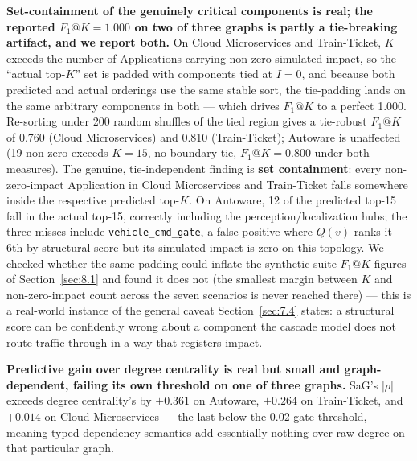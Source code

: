\textbf{Set-containment of the genuinely critical components is real; the reported \(F_1@K=1.000\) on
two of three graphs is partly a tie-breaking artifact, and we report both.} On Cloud Microservices
and Train-Ticket, \(K\) exceeds the number of Applications carrying non-zero simulated impact, so the
``actual top-\(K\)'' set is padded with components tied at \(I=0\), and because both predicted and
actual orderings use the same stable sort, the tie-padding lands on the same arbitrary components in
both --- which drives \(F_1@K\) to a perfect 1.000. Re-sorting under 200 random shuffles of the tied
region gives a tie-robust \(F_1@K\) of 0.760 (Cloud Microservices) and 0.810 (Train-Ticket); Autoware
is unaffected (19 non-zero exceeds \(K=15\), no boundary tie, \(F_1@K=0.800\) under both measures).
The genuine, tie-independent finding is \textbf{set containment}: every non-zero-impact Application
in Cloud Microservices and Train-Ticket falls somewhere inside the respective predicted top-\(K\). On
Autoware, 12 of the predicted top-15 fall in the actual top-15, correctly including the
perception/localization hubs; the three misses include \texttt{vehicle\_cmd\_gate}, a false positive
where \(Q(v)\) ranks it 6th by structural score but its simulated impact is zero on this topology. We
checked whether the same padding could inflate the synthetic-suite \(F_1@K\) figures of
Section~\ref{sec:8.1} and found it does not (the smallest margin between \(K\) and non-zero-impact
count across the seven scenarios is never reached there) --- this is a real-world instance of the
general caveat Section~\ref{sec:7.4} states: a structural score can be confidently wrong about a
component the cascade model does not route traffic through in a way that registers impact.

\textbf{Predictive gain over degree centrality is real but small and graph-dependent, failing its own
threshold on one of three graphs.} SaG's \(|\rho|\) exceeds degree centrality's by \(+0.361\) on
Autoware, \(+0.264\) on Train-Ticket, and \(+0.014\) on Cloud Microservices --- the last below the
\(0.02\) gate threshold, meaning typed dependency semantics add essentially nothing over raw degree
on that particular graph.

